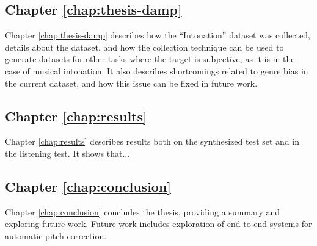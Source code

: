 \subsection{Chapter \ref{chap:thesis-damp}}
Chapter \ref{chap:thesis-damp} describes how the ``Intonation'' dataset was collected, details about the dataset, and how the collection technique can be used to generate datasets for other tasks where the target is subjective, as it is in the case of musical intonation. It also describes shortcomings related to genre bias in the current dataset, and how this issue can be fixed in future work.

\subsection{Chapter \ref{chap:results}}
Chapter \ref{chap:results} describes results both on the synthesized test set and in the listening test. It shows that...

\subsection{Chapter \ref{chap:conclusion}}
Chapter \ref{chap:conclusion} concludes the thesis, providing a summary and exploring future work. Future work includes exploration of end-to-end systems for automatic pitch correction. 




